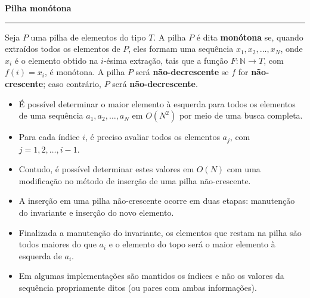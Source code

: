 \noindent
\textbf{Pilha monótona}

\vspace{0.5em}
\hrule
\vspace{0.5em}

Seja $P$ uma pilha de elementos do tipo $T$. A pilha $P$ é dita \textbf{monótona} se, quando extraídos todos os elementos de $P$, eles formam uma sequência $x_1, x_2, \ldots, x_N$, onde $x_i$ é o elemento obtido na $i$-ésima extração, tais que a função $F : \mathbb{N} \to T$, com $f(i) = x_i$, é monótona.
A pilha $P$ será \textbf{não-decrescente} se $f$ for \textbf{não-crescente}; caso contrário, $P$ será \textbf{não-decrescente}.


\begin{itemize}
    \item É possível determinar o maior elemento à esquerda para todos os elementos de uma sequência $a_1, a_2, \ldots, a_N$ em $O(N^2)$ por meio de uma busca completa.

    \item Para cada índice $i$, é preciso avaliar todos os elementos $a_j$, com $j = 1, 2, \ldots, i-1$.

    \item Contudo, é possível determinar estes valores em $O(N)$ com uma modificação no método de inserção de uma pilha não-crescente.

    \item A inserção em uma pilha não-crescente ocorre em duas etapas: manutenção do invariante e inserção do novo elemento.

    \item Finalizada a manutenção do invariante, os elementos que restam na pilha são todos maiores do que $a_i$ e o elemento do topo será o maior elemento à esquerda de $a_i$.

    \item Em algumas implementações são mantidos os índices e não os valores da sequência propriamente ditos (ou pares com ambas informações).
\end{itemize}